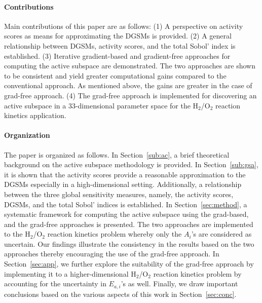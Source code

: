
\paragraph{Contributions}
Main contributions of this paper are as follows: (1) A perspective on activity
scores as means for approximating the DGSMs is provided. (2) A general
relationship between DGSMs, activity scores, and the total Sobol' index is
established. (3) Iterative gradient-based and gradient-free approaches for
computing the active subspace are demonstrated. The two approaches are shown to
be consistent and yield greater computational gains compared to the
conventional approach. As mentioned above, the gains are greater in the case of
grad-free approach. (4) The grad-free approach is implemented for discovering
an active subspace in a 33-dimensional parameter space for the H$_2$/O$_2$
reaction kinetics application. 
 

 \paragraph{Organization}
 The paper is organized as follows. In Section~\ref{sub:ac}, a brief theoretical background on
 the active subspace methodology is provided. In Section~\ref{sub:gsa}, it is shown that the activity
 scores provide a reasonable approximation to the DGSMs especially in a high-dimensional setting. 
 Additionally, a relationship between the three global sensitivity measures, namely, the activity scores,
 DGSMs, and the total Sobol' indices is established. In Section~\ref{sec:method}, a systematic framework
 for computing the active subspace using the grad-based, and the grad-free approaches is presented. 
The two approaches are implemented to the H$_2$/O$_2$ reaction kinetics problem whereby only
the $A_i$'s are considered as uncertain. Our findings illustrate the consistency in the results based on
the two approaches thereby encouraging the use of the grad-free approach. In Section~\ref{sec:app},
we further explore the suitability of the grad-free approach by implementing it to a higher-dimensional
H$_2$/O$_2$ reaction kinetics problem by accounting for the uncertainty in $E_{a,i}$'s as well. 
Finally, we draw important conclusions based on the various aspects of this work in Section~\ref{sec:conc}.










 




